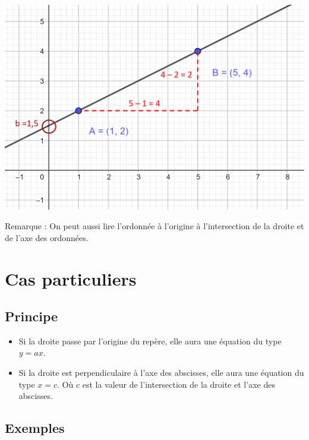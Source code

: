 \documentclass[12pt,a4paper]{article}
\begin{document}
	
	\begin{center}
		\includegraphics[scale=0.5]{img/calcul_eq2}
	\end{center}

	Remarque : On peut aussi lire l'ordonnée à l'origine à l'intersection de la droite et de l'axe des ordonnées.
	
\newpage

\section{Cas particuliers}

\subsection{Principe}
\begin{itemize}
	\item Si la droite passe par l'origine du repère, elle aura une équation du type $y=ax$.
	
	\item Si la droite est perpendiculaire à l'axe des abscisses, elle aura une équation du type $x=c$. Où $c$ est la valeur de l'intersection de la droite et l'axe des abscisses.
\end{itemize}

\subsection{Exemples}
\end{document}
